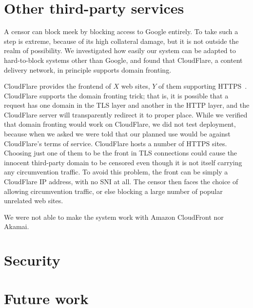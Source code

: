 \documentclass{article}
\begin{document}
\section{Other third-party services}
\label{sec:otherservices}

A censor can block meek by blocking access to Google entirely.
To take such a step is extreme, because of its high collateral damage,
but it is not outside the realm of possibility.
We investigated how easily our system can be adapted to hard-to-block systems other than Google,
and found that CloudFlare, a content delivery network, in principle supports domain fronting.

CloudFlare provides the frontend of $X$ web sites, $Y$ of them supporting HTTPS~\cite{something}.
CloudFlare supports the domain fronting trick;
that is, it is possible that a request has one domain in the TLS layer
and another in the HTTP layer, and the CloudFlare server will transparently redirect it to proper place.
While we verified that domain fronting would work on CloudFlare,
we did not test deployment,
because when we asked we were told that our planned use would be against CloudFlare's terms of service.
CloudFlare hosts a number of HTTPS sites.
Choosing just one of them to be the front in TLS connections could cause
the innocent third-party domain to be censored even though it is not itself carrying any circumvention traffic.
To avoid this problem, the front can be simply a CloudFlare IP address,
with no SNI at all.
The censor then faces the choice of allowing circumvention traffic,
or else blocking a large number of popular unrelated web sites.

We were not able to make the system work with Amazon CloudFront nor Akamai.

\section{Security}


\section{Future work}




  

\end{document}
